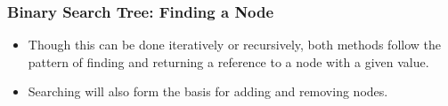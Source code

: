 \documentclass{beamer}
\begin{document}
%
%
\begin{frame}
    \frametitle{Binary Search Tree: Finding a Node}
    \vfill
    \begin{minipage}{0.52\textwidth}
        \centering
        \begin{algorithm}[H]
            \tiny
            \DontPrintSemicolon
        \end{algorithm}
    \end{minipage}
    \hfill
    \begin{minipage}{0.47\textwidth}
        \begin{itemize}
            \item Though this can be done iteratively or recursively, both methods follow the pattern of finding and returning a reference to a node with a given value.
                \pause
            \item Searching will also form the basis for adding and removing nodes.
        \end{itemize}
    \end{minipage}
    \vfill
\end{frame}
\end{document}
